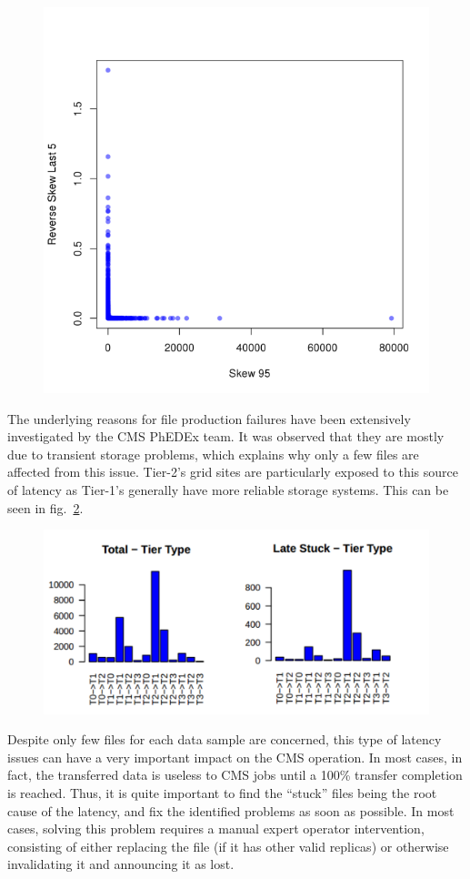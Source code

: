 \begin{figure}[htp]
\centering
\includegraphics{Figures/figure-52.pdf}
\caption{}\label{fig:figure-5.2}
\end{figure}

The underlying reasons for file production failures have been
extensively investigated by the CMS PhEDEx team.  It was observed that
they are mostly due to transient storage problems, which explains why
only a few files are affected from this issue. Tier-2's grid sites are
particularly exposed to this source of latency as Tier-1's generally
have more reliable storage systems. This can be seen in
fig.~\ref{fig:figure-5.3}.

\begin{figure}[htp]
\centering
\includegraphics{Figures/figure-53.pdf}
\caption{}\label{fig:figure-5.3}
\end{figure}


Despite only few files for each data sample are concerned, this type
of latency issues can have a very important impact on the CMS
operation. In most cases, in fact, the transferred data is useless to
CMS jobs until a 100\% transfer completion is reached. Thus, it is
quite important to find the “stuck” files being the root cause of the
latency, and fix the identified problems as soon as possible. In most
cases, solving this problem requires a manual expert operator
intervention, consisting of either replacing the file (if it has other
valid replicas) or otherwise invalidating it and announcing it as
lost.
